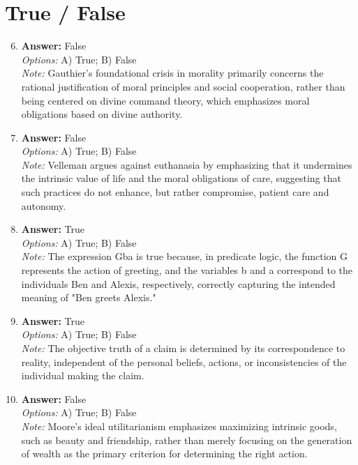 \documentclass[12pt]{article}
\begin{document}
\section*{True / False}
\begin{enumerate}[label=\arabic*.]
\setcounter{enumi}{5}
\item \textbf{Answer:} False
\\ \textit{Options:} A) True; B) False
\\ \textit{Note:} Gauthier's foundational crisis in morality primarily concerns the rational justification of moral principles and social cooperation, rather than being centered on divine command theory, which emphasizes moral obligations based on divine authority.
\item \textbf{Answer:} False
\\ \textit{Options:} A) True; B) False
\\ \textit{Note:} Velleman argues against euthanasia by emphasizing that it undermines the intrinsic value of life and the moral obligations of care, suggesting that such practices do not enhance, but rather compromise, patient care and autonomy.
\item \textbf{Answer:} True
\\ \textit{Options:} A) True; B) False
\\ \textit{Note:} The expression Gba is true because, in predicate logic, the function G represents the action of greeting, and the variables b and a correspond to the individuals Ben and Alexis, respectively, correctly capturing the intended meaning of "Ben greets Alexis."
\item \textbf{Answer:} True
\\ \textit{Options:} A) True; B) False
\\ \textit{Note:} The objective truth of a claim is determined by its correspondence to reality, independent of the personal beliefs, actions, or inconsistencies of the individual making the claim.
\item \textbf{Answer:} False
\\ \textit{Options:} A) True; B) False
\\ \textit{Note:} Moore's ideal utilitarianism emphasizes maximizing intrinsic goods, such as beauty and friendship, rather than merely focusing on the generation of wealth as the primary criterion for determining the right action.
\end{enumerate}
\end{document}
